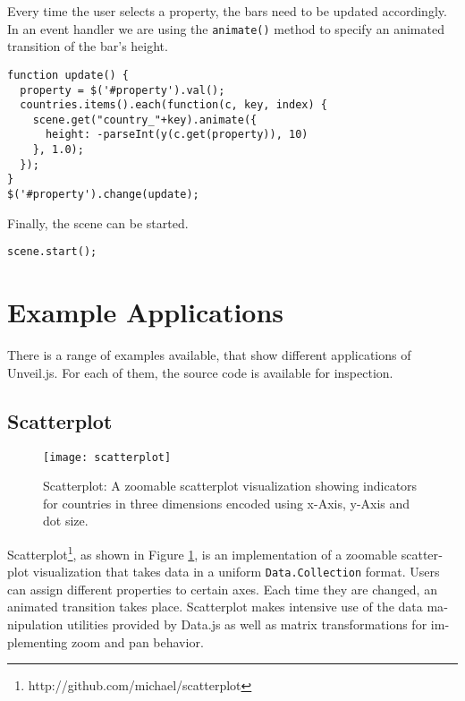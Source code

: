 \begin{english}
\SuperPar Every time the user selects a property, the bars need to be updated accordingly. In an event handler we are using the \texttt{animate()} method to specify an animated transition of the bar's height.

\begin{verbatim}
function update() {
  property = $('#property').val();
  countries.items().each(function(c, key, index) {
    scene.get("country_"+key).animate({
      height: -parseInt(y(c.get(property)), 10)
    }, 1.0);
  });
}
$('#property').change(update);
\end{verbatim}

\SuperPar Finally, the scene can be started.

\begin{verbatim}
scene.start();
\end{verbatim}


\section{Example Applications}


There is a range of examples available, that show different applications of Unveil.js. For each of them, the source code is available for inspection.

\subsection{Scatterplot}

\begin{figure}
\centering
\texttt{[image: scatterplot]}
\caption{Scatterplot: A zoomable scatterplot visualization showing indicators for countries in three dimensions encoded using x-Axis, y-Axis and dot size.}
\label{fig:scatterplot}
\end{figure}

Scatterplot\footnote{http://github.com/michael/scatterplot}, as shown in Figure \ref{fig:scatterplot}, is an implementation of a zoomable scatterplot visualization that takes data in a uniform \texttt{Data.Collection} format. Users can assign different properties to certain axes. Each time they are changed, an animated transition takes place. Scatterplot makes intensive use of the data manipulation utilities provided by Data.js as well as matrix transformations for implementing zoom and pan behavior.



\end{english}
